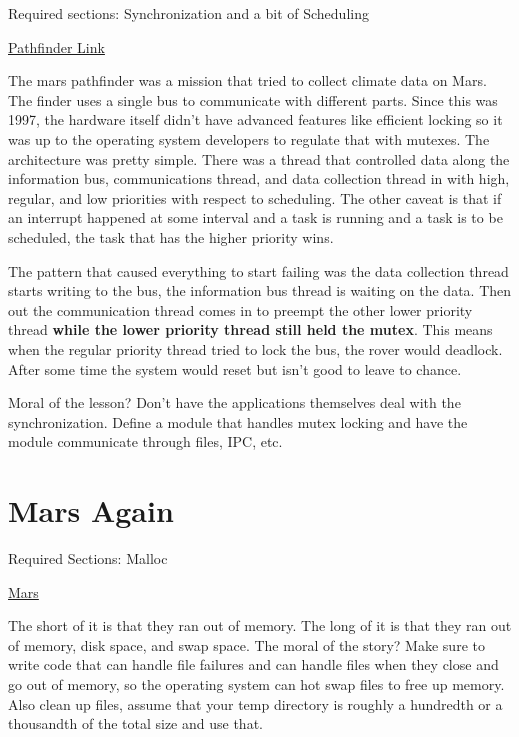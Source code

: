 Required sections: Synchronization and a bit of Scheduling

\href{https://www.microsoft.com/en-us/research/people/mbj/#!just-for-fun}{Pathfinder Link}

The mars pathfinder was a mission that tried to collect climate data on Mars. The finder uses a single bus to communicate with different parts. Since this was 1997, the hardware itself didn't have advanced features like efficient locking so it was up to the operating system developers to regulate that with mutexes. The architecture was pretty simple. There was a thread that controlled data along the information bus, communications thread, and data collection thread in with high, regular, and low priorities with respect to scheduling. The other caveat is that if an interrupt happened at some interval and a task is running and a task is to be scheduled, the task that has the higher priority wins.

The pattern that caused everything to start failing was the data collection thread starts writing to the bus, the information bus thread is waiting on the data.
Then out the communication thread comes in to preempt the other lower priority thread \textbf{while the lower priority thread still held the mutex}. This means when the regular priority thread tried to lock the bus, the rover would deadlock.
After some time the system would reset but isn't good to leave to chance.

Moral of the lesson? Don't have the applications themselves deal with the synchronization. Define a module that handles mutex locking and have the module communicate through files, IPC, etc.

\section{Mars Again}

Required Sections: Malloc

\href{https://www.computerworld.com/article/2574759/data-storage-solutions/out-of-memory-problem-caused-mars-rover-s-glitch.html}{Mars}

The short of it is that they ran out of memory. The long of it is that they ran out of memory, disk space, and swap space. The moral of the story? Make sure to write code that can handle file failures and can handle files when they close and go out of memory, so the operating system can hot swap files to free up memory. Also clean up files, assume that your temp directory is roughly a hundredth or a thousandth of the total size and use that.

